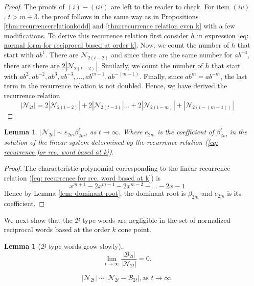 \documentclass[11pt]{amsart}
\numberwithin{equation}{section}
\theoremstyle{plain}
\newtheorem{lem}[thm]{Lemma}
\begin{document}
\begin{proof} The proofs of $(i)-(iii)$ are left to the reader to check. 
For item $(iv)$,  $t>m+3$, the proof follows  in the same way as in  Propositions \ref{thm:recurrencerelationkodd} and \ref{thm:recurrence relation even k} with a few modifications. 
To   derive this  recurrence relation  first  consider  $h$  in expression
\ref{eq: normal form for reciprocal based at order k}.  Now, we count the number of
$h$ that start with $ab^{1}$. There are $\mathcal{N}_{2(t-2)}$ 
and since there are the same number for  $ab^{-1}$, there are
there are 
$2|\mathcal{N}_{2(t-2)}|$. Similarly, we count the number of 
$h$ that start with   
$ab^{2},  ab^{-2}, ab^{3},ab^{-3}, ..., ab^{m-1}, ab^{-(m-1)}$.
Finally,  since $ab^{m}=ab^{-m}$,  the last term in the recurrence relation is not doubled. Hence,  we have derived the recurrence  relation
$$
|\mathcal{N}_{2t}| = 2|\mathcal{N}_{2(t-2)}|  + 2|\mathcal{N}_{2(t-3)}|  \dots + 
2|\mathcal{N}_{2(t-m)}| + |\mathcal{N}_{2(t-(m+1))}|
$$ 
\end{proof}


\begin{lem}\label{lem: recurrence asymtotic for base at k}
$|\mathcal{N}_{2t}| \sim e_{2m} \beta_{2m} ^{t}$, as $t \to \infty$. 
Where  $e_{2m}$ is the coefficient of $\beta_{2m}^{t}$ in the solution of the linear system determined by  the recurrence relation (\ref{eq: recurrence for rec. word based at k}).
\end{lem}

\begin{proof}
The characteristic polynomial corresponding to the linear recurrence relation 
(\ref{eq: recurrence for rec. word based at k}) is
$$
x^{m+1}-2x^{m-1}-2x^{m-2}-...-2x-1
$$
Hence by Lemma   \ref{lem: dominant root}, the dominant root is $\beta_{2m}$ and $e_{2m}$ is  its coefficient.
\end{proof}

We next show that the $\mathcal{B}$-type words are negligible
in the set of normalized reciprocal words based at the order $k$ cone point. 

\begin{lem}[$\mathcal{B}$-type words grow slowly]
\label{lem:Btypebased at k small}
\[\displaystyle\lim_{t\to\infty}\dfrac{|\mathcal{B}_{2t}|}{|\mathcal{N}_{2t}|}=0.\]

\begin{equation}
\label{eqn:atypesdominate for base k}
|\mathcal{N}_{2t}|\sim|\mathcal{N}_{2t}-\mathcal{B}_{2t}|, \textrm{as}\,\,t\to\infty.
\end{equation}
\end{lem}
\end{document}
